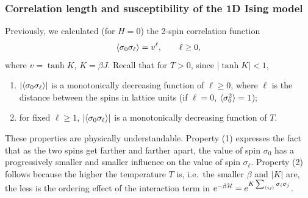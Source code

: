 \subsubsection*{Correlation length and susceptibility of the 1D Ising model}

Previously, we calculated (for $H = 0$) the 2-spin correlation function
\begin{equation}
  \langle \sigma_0\sigma_\ell\rangle = v^\ell,\qquad \ell\ge 0,
\end{equation}
where $v = \tanh K$, $K = \beta J$. Recall that for $T>0$, since $|\tanh K|<1$,
\begin{enumerate}[label=(\arabic*)]
  \item $|\langle \sigma_0\sigma_\ell\rangle|$ is a monotonically decreasing function of $\ell\ge 0$, where $\ell$ is the distance
    between the spins in lattice units (if $\ell = 0$, $\langle \sigma_0^2\rangle = 1$);
  \item for fixed $\ell\ge 1$, $|\langle \sigma_0\sigma_\ell\rangle|$ is a monotonically decreasing function of $T$.
\end{enumerate}
These properties are physically understandable. Property (1) expresses the fact that as the two spins get farther and
farther apart, the value of spin $\sigma_0$ has a progressively smaller and smaller influence on the value of spin
$\sigma_\ell$. Property (2) follows because the higher the temperature $T$ is, i.e.\ the smaller $\beta$ and $|K|$ are, the
less is the ordering effect of the interaction term in $e^{-\beta\mathcal{H}} = e^{K\sum_{\langle ij\rangle}\sigma_i\sigma_j}$.

